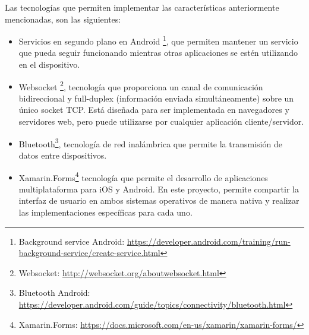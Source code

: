 Las tecnologías que permiten implementar las características anteriormente mencionadas, son las siguientes:
\begin{itemize}

\item Servicios en segundo plano en Android \footnote{Background service Android: \url{https://developer.android.com/training/run-background-service/create-service.html}}, que permiten mantener un servicio que pueda seguir funcionando mientras otras aplicaciones se estén utilizando en el dispositivo.

\item Websocket \footnote{Websocket: \url{http://websocket.org/aboutwebsocket.html}}, tecnología que proporciona un canal de comunicación bidireccional y full-duplex (información enviada simultáneamente) sobre un único socket TCP. Está diseñada para ser implementada en navegadores y servidores web, pero puede utilizarse por cualquier aplicación cliente/servidor.

\item Bluetooth\footnote{Bluetooth Android: \url{https://developer.android.com/guide/topics/connectivity/bluetooth.html}}, tecnología de red inalámbrica que permite la transmisión de datos entre dispositivos.

\item Xamarin.Forms\footnote{Xamarin.Forms: \url{https://docs.microsoft.com/en-us/xamarin/xamarin-forms/}} tecnología que permite el desarrollo de aplicaciones multiplataforma para iOS y Android. En este proyecto, permite compartir la interfaz de usuario en ambos sistemas operativos de manera nativa y realizar las implementaciones específicas para cada uno.

\end{itemize}




